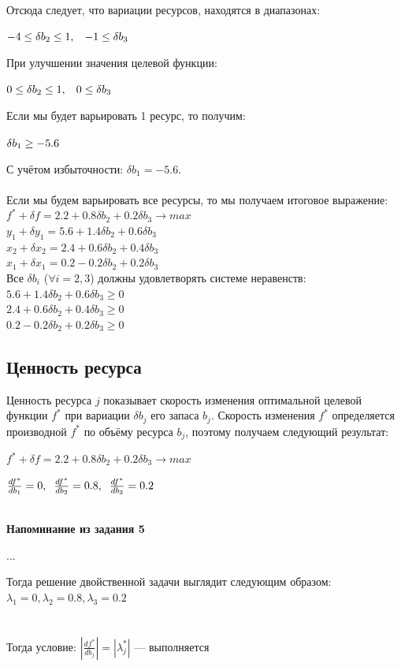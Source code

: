 \documentclass[14pt,a4paper,fleqn]{extarticle}
\begin{document}
Отсюда следует, что вариации ресурсов, находятся в диапазонах:
\begin{center}
	$-4 \leq \delta b_2 \leq 1, \hspace*{0.3cm} -1 \leq \delta b_3$
\end{center}
При улучшении значения целевой функции:
\begin{center}
	$0 \leq \delta b_2 \leq 1, \hspace*{0.3cm} 0 \leq \delta b_3$
\end{center}
Если мы будет варьировать 1 ресурс, то получим:
\begin{center}
	$\delta b_1 \geq -5.6 \hspace*{0.5cm}$
\end{center}
С учётом избыточности: $\delta b_1 = -5.6$.\\\\
Если мы будем варьировать все ресурсы, то мы получаем итоговое выражение:\\
$f^* + \delta f = 2.2 + 0.8\delta b_2 + 0.2\delta b_3 \longrightarrow max$\\
$y_1 + \delta y_1 = 5.6 + 1.4 \delta b_2 + 0.6 \delta b_3$\\
$x_2 + \delta x_2 = 2.4 + 0.6 \delta b_2 + 0.4 \delta b_3$\\
$x_1 + \delta x_1 = 0.2 - 0.2 \delta b_2 + 0.2 \delta b_3$\\
\newpage
Все $\delta b_i$ ($\forall i = 2,3$) должны удовлетворять системе неравенств:\\
$5.6 + 1.4 \delta b_2 + 0.6 \delta b_3 \geq 0 $\\
$2.4 + 0.6 \delta b_2 + 0.4 \delta b_3 \geq 0$\\
$0.2 - 0.2 \delta b_2 + 0.2 \delta b_3 \geq 0$
\subsection*{Ценность ресурса}
Ценность ресурса $j$ показывает скорость изменения оптимальной целевой функции $f^*$ при вариации $\delta b_j$ его запаса $b_j$. Скорость изменения $f^*$ определяется производной $f^*$ по объёму ресурса $b_j$, поэтому получаем следующий результат:
\begin{center}
	$f^* + \delta f = 2.2 + 0.8\delta b_2 + 0.2\delta b_3 \longrightarrow max$
\end{center}
\begin{center}
	\large $\frac{df^*}{db_1} = 0, \hspace*{0.2cm} \frac{df^*}{db_2} = 0.8, \hspace*{0.2cm} \frac{df^*}{db_3} = 0.2$
\end{center}
\noindent\makebox[\linewidth]{\rule{\paperwidth}{0.4pt}}\\
\textbf{Напоминание из задания 5}
\begin{center}
	...
\end{center}
Тогда решение двойственной задачи выглядит следующим образом:\\
$\lambda_1 = 0, \lambda_2 = 0.8, \lambda_3 = 0.2$\\
\noindent\makebox[\linewidth]{\rule{\paperwidth}{0.4pt}}\\\\
Тогда условие: \large $|\frac{df^*}{db_j}| = |\lambda_j^*|$ \normalsize --- выполняется
\end{document}

